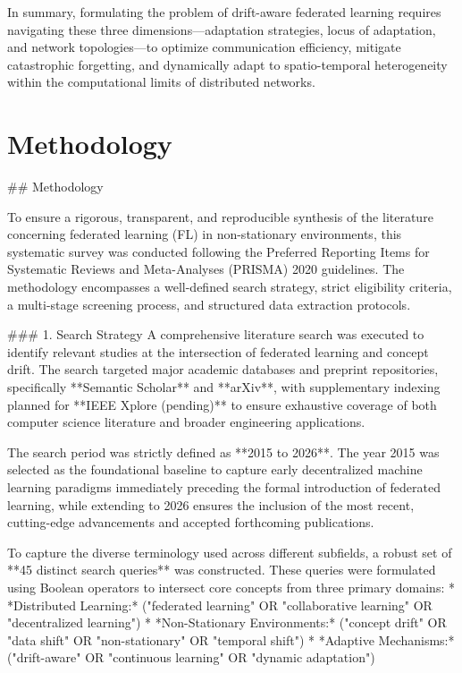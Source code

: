 \documentclass[journal]{IEEEtran}
\begin{document}
In summary, formulating the problem of drift-aware federated learning requires navigating these three dimensions—adaptation strategies, locus of adaptation, and network topologies—to optimize communication efficiency, mitigate catastrophic forgetting, and dynamically adapt to spatio-temporal heterogeneity within the computational limits of distributed networks.

\section{Methodology}
\label{sec:methodology}

\#\# Methodology

To ensure a rigorous, transparent, and reproducible synthesis of the literature concerning federated learning (FL) in non-stationary environments, this systematic survey was conducted following the Preferred Reporting Items for Systematic Reviews and Meta-Analyses (PRISMA) 2020 guidelines. The methodology encompasses a well-defined search strategy, strict eligibility criteria, a multi-stage screening process, and structured data extraction protocols.

\#\#\# 1. Search Strategy
A comprehensive literature search was executed to identify relevant studies at the intersection of federated learning and concept drift. The search targeted major academic databases and preprint repositories, specifically **Semantic Scholar** and **arXiv**, with supplementary indexing planned for **IEEE Xplore (pending)** to ensure exhaustive coverage of both computer science literature and broader engineering applications. 

The search period was strictly defined as **2015 to 2026**. The year 2015 was selected as the foundational baseline to capture early decentralized machine learning paradigms immediately preceding the formal introduction of federated learning, while extending to 2026 ensures the inclusion of the most recent, cutting-edge advancements and accepted forthcoming publications. 

To capture the diverse terminology used across different subfields, a robust set of **45 distinct search queries** was constructed. These queries were formulated using Boolean operators to intersect core concepts from three primary domains: 
*   *Distributed Learning:* ("federated learning" OR "collaborative learning" OR "decentralized learning")
*   *Non-Stationary Environments:* ("concept drift" OR "data shift" OR "non-stationary" OR "temporal shift")
*   *Adaptive Mechanisms:* ("drift-aware" OR "continuous learning" OR "dynamic adaptation")
\end{document}
